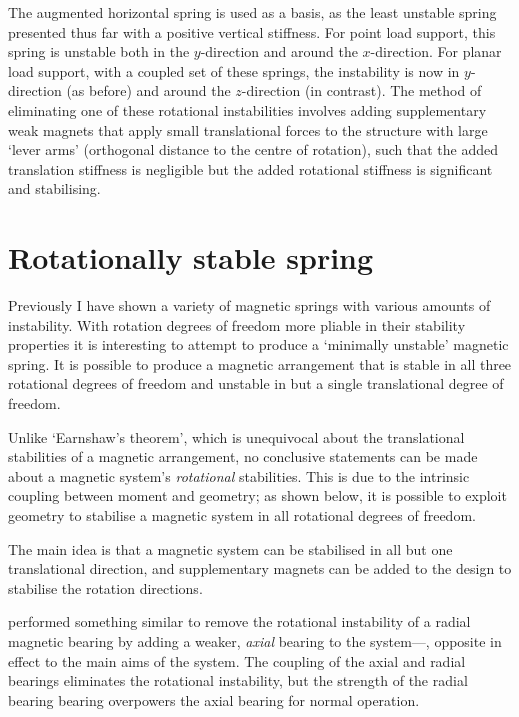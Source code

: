 The augmented horizontal spring is used as a basis, as the least
unstable spring presented thus far with a positive vertical
stiffness. For point load support, this spring is unstable both in the
$y$-direction and around the $x$-direction. For planar load support,
with a coupled set of these springs, the instability is now in $y$-direction 
(as before) and around the $z$-direction (in contrast). The
method of eliminating one of these rotational instabilities involves
adding supplementary weak magnets that apply small translational
forces to the structure with large `lever arms' (orthogonal distance
to the centre of rotation), such that the added translation stiffness
is negligible but the added rotational stiffness is significant and
stabilising.

\section{Rotationally stable spring}

Previously I have shown a variety of magnetic springs with various
amounts of instability. With rotation degrees of freedom more pliable
in their stability properties it is interesting to attempt to produce
a `minimally unstable' magnetic spring. It is possible to produce a
magnetic arrangement that is stable in all three rotational degrees of
freedom and unstable in but a single translational degree of freedom.

Unlike `Earnshaw's theorem', which is unequivocal about the
translational stabilities of a magnetic arrangement, no conclusive
statements can be made about a magnetic system's \emph{rotational}
stabilities. This is due to the intrinsic coupling between moment and
geometry; as shown below, it is possible to exploit geometry to
stabilise a magnetic system in all rotational degrees of freedom.

The main idea is that a magnetic system can be
stabilised in all but one translational direction, and 
supplementary magnets can be added to the design to stabilise the
rotation directions.

\textcite{delamare1994} performed something similar to remove the
rotational instability of a radial magnetic bearing by adding a
weaker, \emph{axial} bearing to the system—\ie, opposite in effect
to the main aims of the system. The coupling of the axial and radial
bearings eliminates the rotational instability, but the strength of
the radial bearing bearing overpowers the axial bearing for normal
operation.

